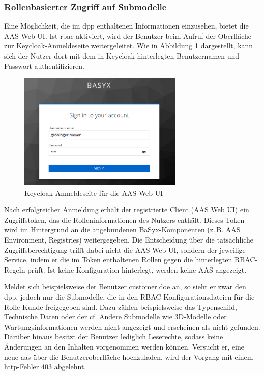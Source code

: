 \subsubsection{Rollenbasierter Zugriff auf Submodelle}
Eine Möglichkeit, die im \acs{dpp} enthaltenen Informationen einzusehen, bietet die AAS Web UI. 
Ist \acs{rbac} aktiviert, wird der Benutzer beim Aufruf der Oberfläche zur Keycloak-Anmeldeseite weitergeleitet. 
Wie in Abbildung \ref{fig:KeycloakAnmeldeSeite} dargestellt, kann sich der Nutzer dort mit dem in Keycloak hinterlegten Benutzernamen und Passwort authentifizieren.

\begin{figure}[htbp]
    \centering
        \includegraphics[width=0.7\textwidth]{Bilder/Ergebnisse/DPP/KeycloakAnmeldeSeite.png}
    \caption{Keycloak-Anmeldeseite für die AAS Web UI}
    \label{fig:KeycloakAnmeldeSeite}
\end{figure}

Nach erfolgreicher Anmeldung erhält der registrierte Client (AAS Web UI) ein Zugriffstoken, das die Rolleninformationen des Nutzers enthält.  
Dieses Token wird im Hintergrund an die angebundenen BaSyx-Komponenten (z.\,B. AAS Environment, Registries) weitergegeben.  
Die Entscheidung über die tatsächliche Zugriffsberechtigung trifft dabei nicht die AAS Web UI, sondern der jeweilige Service, indem er die im Token enthaltenen Rollen gegen die hinterlegten RBAC-Regeln prüft.
Ist keine Konfiguration hinterlegt, werden keine AAS angezeigt.

Meldet sich beispielsweise der Benutzer customer.doe an, so sieht er zwar den \acs{dpp}, jedoch nur die Submodelle, die in den RBAC-Konfigurationsdateien für die Rolle Kunde freigegeben sind. 
Dazu zählen beispielsweise das Typenschild, Technische Daten oder der \acs{cf}. 
Andere Submodelle wie 3D-Modelle oder Wartungsinformationen werden nicht angezeigt und erscheinen als nicht gefunden. 
Darüber hinaus besitzt der Benutzer lediglich Leserechte, sodass keine Änderungen an den Inhalten vorgenommen werden können. 
Versucht er, eine neue \acs{aas} über die Benutzeroberfläche hochzuladen, wird der Vorgang mit einem \acs{http}-Fehler 403 abgelehnt.

